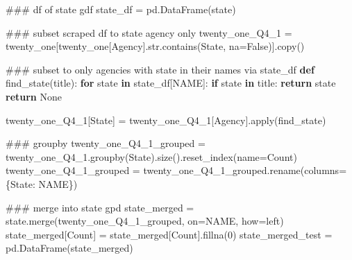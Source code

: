 \documentclass[
  letterpaper,
  DIV=11,
  numbers=noendperiod]{scrartcl}
\newenvironment{Shaded}{\begin{snugshade}}{\end{snugshade}}
\newcommand{\BuiltInTok}[1]{\textcolor[rgb]{0.00,0.23,0.31}{#1}}
\newcommand{\CommentTok}[1]{\textcolor[rgb]{0.37,0.37,0.37}{#1}}
\newcommand{\ControlFlowTok}[1]{\textcolor[rgb]{0.00,0.23,0.31}{\textbf{#1}}}
\newcommand{\DecValTok}[1]{\textcolor[rgb]{0.68,0.00,0.00}{#1}}
\newcommand{\KeywordTok}[1]{\textcolor[rgb]{0.00,0.23,0.31}{\textbf{#1}}}
\newcommand{\NormalTok}[1]{\textcolor[rgb]{0.00,0.23,0.31}{#1}}
\newcommand{\OperatorTok}[1]{\textcolor[rgb]{0.37,0.37,0.37}{#1}}
\newcommand{\StringTok}[1]{\textcolor[rgb]{0.13,0.47,0.30}{#1}}
\newcommand{\VariableTok}[1]{\textcolor[rgb]{0.07,0.07,0.07}{#1}}
\begin{document}
\begin{Shaded}
\begin{Highlighting}[]
\CommentTok{\#\#\# df of state gdf}
\NormalTok{state\_df }\OperatorTok{=}\NormalTok{ pd.DataFrame(state)}

\CommentTok{\#\#\# subset scraped df to state agency only}
\NormalTok{twenty\_one\_Q4\_1 }\OperatorTok{=}\NormalTok{ twenty\_one[twenty\_one[}\StringTok{\textquotesingle{}Agency\textquotesingle{}}\NormalTok{].}\BuiltInTok{str}\NormalTok{.contains(}\StringTok{\textquotesingle{}State\textquotesingle{}}\NormalTok{, na}\OperatorTok{=}\VariableTok{False}\NormalTok{)].copy()}

\CommentTok{\#\#\# subset to only agencies with state in their names via state\_df}
\KeywordTok{def}\NormalTok{ find\_state(title):}
    \ControlFlowTok{for}\NormalTok{ state }\KeywordTok{in}\NormalTok{ state\_df[}\StringTok{\textquotesingle{}NAME\textquotesingle{}}\NormalTok{]:}
        \ControlFlowTok{if}\NormalTok{ state }\KeywordTok{in}\NormalTok{ title:}
            \ControlFlowTok{return}\NormalTok{ state}
    \ControlFlowTok{return} \VariableTok{None}

\NormalTok{twenty\_one\_Q4\_1[}\StringTok{\textquotesingle{}State\textquotesingle{}}\NormalTok{] }\OperatorTok{=}\NormalTok{ twenty\_one\_Q4\_1[}\StringTok{\textquotesingle{}Agency\textquotesingle{}}\NormalTok{].}\BuiltInTok{apply}\NormalTok{(find\_state)}

\CommentTok{\#\#\# groupby}
\NormalTok{twenty\_one\_Q4\_1\_grouped }\OperatorTok{=}\NormalTok{ twenty\_one\_Q4\_1.groupby(}\StringTok{\textquotesingle{}State\textquotesingle{}}\NormalTok{).size().reset\_index(name}\OperatorTok{=}\StringTok{\textquotesingle{}Count\textquotesingle{}}\NormalTok{)}
\NormalTok{twenty\_one\_Q4\_1\_grouped }\OperatorTok{=}\NormalTok{ twenty\_one\_Q4\_1\_grouped.rename(columns}\OperatorTok{=}\NormalTok{\{}\StringTok{\textquotesingle{}State\textquotesingle{}}\NormalTok{: }\StringTok{\textquotesingle{}NAME\textquotesingle{}}\NormalTok{\})}

\CommentTok{\#\#\# merge into state gpd}
\NormalTok{state\_merged }\OperatorTok{=}\NormalTok{ state.merge(twenty\_one\_Q4\_1\_grouped, on}\OperatorTok{=}\StringTok{\textquotesingle{}NAME\textquotesingle{}}\NormalTok{, how}\OperatorTok{=}\StringTok{\textquotesingle{}left\textquotesingle{}}\NormalTok{)}
\NormalTok{state\_merged[}\StringTok{\textquotesingle{}Count\textquotesingle{}}\NormalTok{] }\OperatorTok{=}\NormalTok{ state\_merged[}\StringTok{\textquotesingle{}Count\textquotesingle{}}\NormalTok{].fillna(}\DecValTok{0}\NormalTok{)}
\NormalTok{state\_merged\_test }\OperatorTok{=}\NormalTok{ pd.DataFrame(state\_merged)}
\end{Highlighting}
\end{Shaded}
\end{document}
